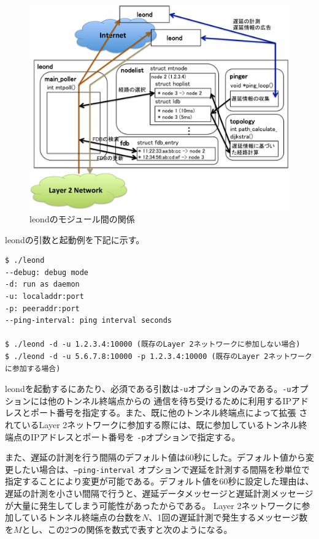 \begin{figure}
	\begin{center}
		\includegraphics[scale=0.70]{./img/leonoverview}
		\caption{leondのモジュール間の関係}
		\label{img:leonoverview}
	\end{center}
\end{figure}

leondの引数と起動例を下記に示す。

\begin{verbatim}
$ ./leond
--debug: debug mode
-d: run as daemon
-u: localaddr:port
-p: peeraddr:port
--ping-interval: ping interval seconds

$ ./leond -d -u 1.2.3.4:10000 (既存のLayer 2ネットワークに参加しない場合)
$ ./leond -d -u 5.6.7.8:10000 -p 1.2.3.4:10000 (既存のLayer 2ネットワークに参加する場合)
\end{verbatim}

leondを起動するにあたり、必須である引数は\texttt{-u}オプションのみである。\texttt{-u}オプションには他のトンネル終端点からの
通信を待ち受けるために利用するIPアドレスとポート番号を指定する。また、既に他のトンネル終端点によって拡張
されているLayer 2ネットワークに参加する際には、既に参加しているトンネル終端点のIPアドレスとポート番号を
\texttt{-p}オプションで指定する。

また、遅延の計測を行う間隔のデフォルト値は60秒にした。デフォルト値から変更したい場合は、\texttt{--ping-interval}
オプションで遅延を計測する間隔を秒単位で指定することにより変更が可能である。デフォルト値を60秒に設定した理由は、
遅延の計測を小さい間隔で行うと、遅延データメッセージと遅延計測メッセージが大量に発生してしまう可能性があったからである。
Layer 2ネットワークに参加しているトンネル終端点の台数を$ N $、1回の遅延計測で発生するメッセージ数を$ M $とし、この2つの関係を数式で表すと次のようになる。

